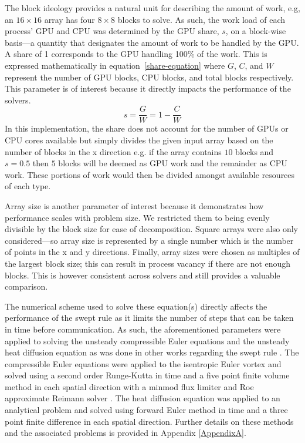 \documentclass[review]{elsarticle}
\begin{document}
\par
The block ideology provides a natural unit for describing the amount of work, e.g, an $16\times16$ array has four $8\times8$ blocks to solve. As such, the work load of each process' GPU and CPU was determined by the GPU share, $s$, on a block-wise basis---a quantity that designates the amount of work to be handled by the GPU. A share of 1 corresponds to the GPU handling 100\% of the work. This is expressed mathematically in equation~\ref{share-equation} where $G$, $C$, and $W$ represent the number of GPU blocks, CPU blocks, and total blocks respectively. This parameter is of interest because it directly impacts the performance of the solvers.
\begin{equation}
    \label{share-equation}
    s = \frac{G}{W} = 1-\frac{C}{W}
\end{equation}
In this implementation, the share does not account for the number of GPUs or CPU cores available but simply divides the given input array based on the number of blocks in the x direction e.g. if the array contains $10$ blocks and $s=0.5$ then $5$ blocks will be deemed as GPU work and the remainder as CPU work. These portions of work would then be divided amongst available resources of each type. 

\par
Array size is another parameter of interest because it demonstrates how performance scales with problem size. We restricted them to being evenly divisible by the block size for ease of decomposition. Square arrays were also only considered---so array size is represented by a single number which is the number of points in the x and y directions. Finally, array sizes were chosen as multiples of the largest block size; this can result in process vacancy if there are not enough blocks. This is however consistent across solvers and still provides a valuable comparison.

\par
The numerical scheme used to solve these equation(s) directly affects the performance of the swept rule as it limits the number of steps that can be taken in time before communication.
As such, the aforementioned parameters were applied to solving the unsteady compressible Euler equations and the unsteady heat diffusion equation as was done in other works regarding the swept rule \cite{Magee2018AcceleratingDecomposition,Alhubail2016ThePDEs,Alhubail2018ThePDEs, Magee2020ApplyingSystems}. The compressible Euler equations were applied to the isentropic Euler vortex and solved using a second order Runge-Kutta in time and a five point finite volume method in each spatial direction with a minmod flux limiter and Roe approximate Reimann solver \cite{SpiegelAMethods,Leveque2002FiniteProblems}. The heat diffusion equation was applied to an analytical problem and solved using forward Euler method in time and a three point finite difference in each spatial direction. Further details on these methods and the associated problems is provided in Appendix \ref{AppendixA}.
\end{document}
